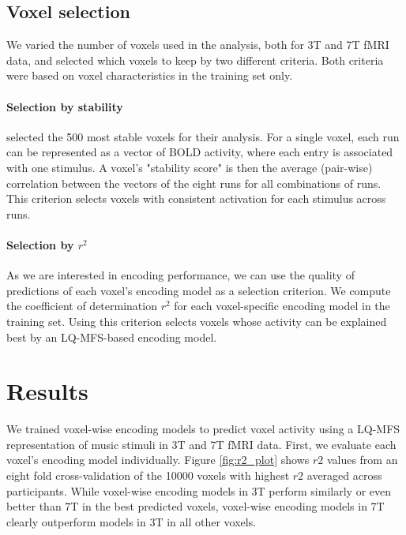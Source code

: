 \subsection*{Voxel selection}

We varied the number of voxels used in the analysis, both for 3T and 7T
f{MRI} data, and selected which voxels to keep by two different criteria. Both
criteria were based on voxel characteristics in the training set only.

\paragraph{Selection by stability}

\citet{ML08} selected the 500 most stable voxels for their analysis. For a
single voxel, each run can be represented as a vector of BOLD activity, where
each entry is associated with one stimulus. A voxel's "stability score" is then
the average (pair-wise) correlation between the vectors of the eight runs for
all combinations of runs.  This criterion selects voxels with consistent
activation for each stimulus across runs.

\paragraph{Selection by $r^2$}

As we are interested in encoding performance, we can use the quality of
predictions of each voxel's encoding model as a selection criterion. We compute
the coefficient of determination $r^2$ for each voxel-specific encoding model
in the training set. Using this criterion selects voxels whose activity can be
explained best by an LQ-MFS-based encoding model.

\section*{Results}

We trained voxel-wise encoding models to predict voxel activity using a LQ-MFS
representation of music stimuli in 3T and 7T f{MRI} data.
First, we evaluate each voxel's encoding model individually.
Figure \ref{fig:r2_plot} shows $r2$ values from an eight fold cross-validation
of the 10000 voxels with highest $r2$ averaged across participants.
While voxel-wise encoding models in 3T perform similarly or even better than 7T
in the best predicted voxels, voxel-wise encoding models in 7T clearly
outperform models in 3T in all other voxels.


